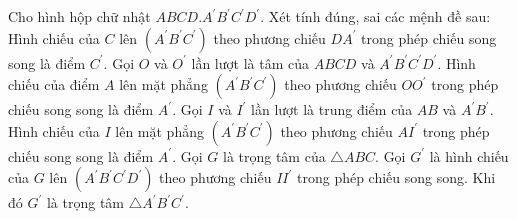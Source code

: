 \begin{ex}
Cho hình hộp chữ nhật $ABCD.A^{\prime}B^{\prime}C^{\prime}D^{\prime}$. Xét tính đúng, sai các mệnh đề sau:
\choiceTF
{Hình chiếu của $C$ lên $(A^{\prime}B^{\prime}C^{\prime})$ theo phương chiếu $DA^{\prime}$ trong phép chiếu song song là điểm $C^{\prime}$.}
{\True Gọi $O$ và $O^{\prime}$ lần lượt là tâm của $ABCD$ và $A^{\prime}B^{\prime}C^{\prime}D^{\prime}$. Hình chiếu của điểm $A$ lên mặt phẳng $(A^{\prime}B^{\prime}C^{\prime})$ theo phương chiếu $OO^{\prime}$ trong phép chiếu song song là điểm $A^{\prime}$.}
{Gọi $I$ và $I^{\prime}$ lần lượt là trung điểm của $AB$ và $A^{\prime}B^{\prime}$. Hình chiếu của $I$ lên mặt phẳng $(A^{\prime}B^{\prime}C^{\prime})$ theo phương chiếu $AI^{\prime}$ trong phép chiếu song song là điểm $A^{\prime}$.}
{\True Gọi $G$ là trọng tâm của $\triangle ABC$. Gọi $G^{\prime}$ là hình chiếu của $G$ lên $(A^{\prime}B^{\prime}C^{\prime}D^{\prime})$ theo phương chiếu $II^{\prime}$ trong phép chiếu song song. Khi đó $G^{\prime}$ là trọng tâm $\triangle A^{\prime}B^{\prime}C^{\prime}$.}
\end{ex}
